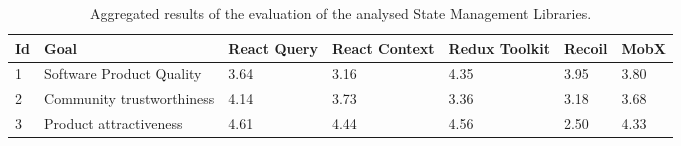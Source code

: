 \begin{longtable}[]{|p{1cm}p{2.5cm}p{1.5cm}p{1.5cm}p{1.5cm}p{1.5cm}p{2cm}|}
    \caption{Aggregated results of the evaluation of the analysed State Management Libraries.}
    \label{table:result_aggregated_goals}\\
    \toprule
Id & Goal & React Query & React Context & Redux Toolkit & Recoil &
MobX \\
\midrule
\endhead
1 & Software Product Quality & 3.64 & 3.16 & 4.35 & 3.95 & 3.80 \\
2 & Community trustworthiness & 4.14 & 3.73 & 3.36 & 3.18 & 3.68 \\
3 & Product attractiveness & 4.61 & 4.44 & 4.56 & 2.50 & 4.33 \\
\bottomrule
\end{longtable}
